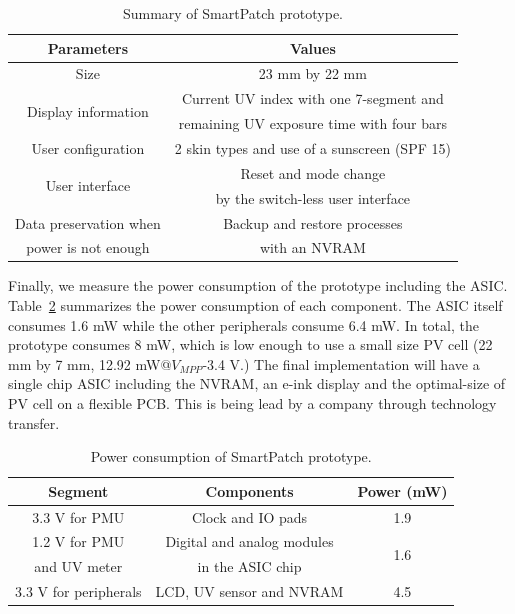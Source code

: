 \documentclass[journal]{IEEEtran}
\begin{document}
\begin{table}
\centering
\caption{Summary of SmartPatch prototype.}
\label{table:prototype_summary}
\begin{tabular}{|c|c|}  \hline
Parameters			&Values	\\ \hline \hline
Size					&23 mm by 22 mm  \\ \hline
\multirow{2}{*}{Display information}	&Current UV index with one 7-segment and\\
					&remaining UV exposure time with four bars \\ \hline
User configuration		&2 skin types and use of a sunscreen (SPF 15) \\ \hline
\multirow{2}{*}{User interface}	&Reset and mode change  \\
					&by the switch-less user interface \\ \hline
Data preservation when 	&Backup and restore processes  \\
power is not enough	&with an NVRAM \\ \hline
\end{tabular}
\end{table}

Finally, we measure the power consumption of the prototype including the ASIC.
Table~\ref{table:power_summary} summarizes the power consumption of each component.
The ASIC itself consumes 1.6 mW while the other peripherals consume 6.4 mW.
In total, the prototype consumes 8 mW, which is low enough to use a small size PV cell (22 mm by 7 mm, 12.92 mW@$V_{MPP}$-3.4 V.)
%
The final implementation will have a single chip ASIC including the NVRAM, an e-ink display and the optimal-size of PV cell on a flexible PCB. This is being lead by a company through technology transfer.

\begin{table}
\centering
\caption{Power consumption of SmartPatch prototype.}
\label{table:power_summary}
\begin{tabular}{|c|c|c|}  \hline
Segment 			&Components					&Power (mW)	\\ \hline \hline
3.3 V for PMU		&Clock and IO pads			&1.9	\\ \hline
1.2 V for PMU 		&Digital and analog modules		&\multirow{2}{*}{1.6}		\\
and UV meter 	&in the ASIC chip 				&\\ \hline
3.3 V for peripherals & LCD, UV sensor and NVRAM	&4.5 \\ \hline

\end{tabular}
\end{table}
\end{document}
